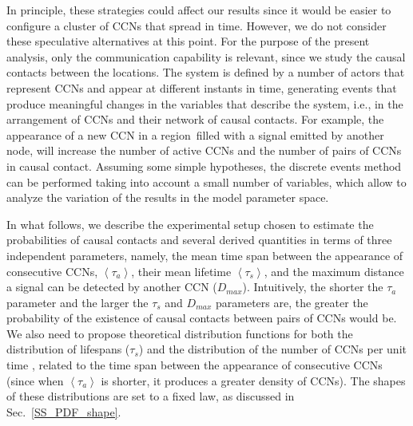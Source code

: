 \documentclass[crop]{CSLB}
\newcommand{\ceti}{CCN}
\newcommand{\cetis}{CCNs}
\begin{document}
%
In principle, these strategies could affect our results since it would be easier to configure a cluster of \cetis{} that spread in time.
%
However, we do not consider these speculative alternatives at this point.
%
For the purpose of the present analysis, only the communication capability is relevant, since we study the causal contacts between the locations.
%
The system is defined by a number of actors that represent \cetis{} and appear at different instants in time, generating events that produce meaningful changes in the variables that describe the system, i.e., in the arrangement of \cetis{} and their network of causal contacts.
%
For example, the appearance of a new \ceti{} in a region filled with a signal emitted by another node, will increase the number of active \cetis{} and the number of pairs of \cetis{} in causal contact.
%
Assuming some simple hypotheses, the discrete events method can be performed taking into account a small number of variables, which allow to analyze the variation of the results in the model parameter space.
















In what follows, we describe the experimental setup chosen to estimate
the probabilities of causal contacts and several derived quantities in
terms of three independent parameters, namely, the mean time span
between the appearance of consecutive \cetis{}, $\left<\tau_a\right>$,
their mean lifetime $\left<\tau_s\right>$, and the maximum distance a
signal can be detected by another \ceti{} ($D_{max}$).
%
Intuitively, the shorter the $\tau_a$ parameter and the larger the
$\tau_s$ and $D_{max}$ parameters are, the greater the probability of
the existence of causal contacts between pairs of \cetis{} would be.
%
We also need to propose theoretical distribution functions for both
the distribution of lifespans ($\tau_s$) and the distribution of the
number of \cetis{} per unit time \citep{maccone_evolution_2014,
Sotos_biotechnology_2019}, related to the time span between the
appearance of consecutive \cetis{} (since when $\left<\tau_a\right>$
is shorter, it produces a greater density of \cetis{}).
%
The shapes of these distributions are set to a fixed law, as discussed
in Sec.~\ref{SS_PDF_shape}.
     
\end{document}
